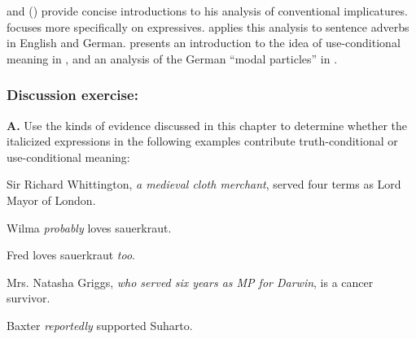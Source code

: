 \citet{Potts2007a,Potts2007b} and (\citeyear{Potts2012}) provide concise introductions to his analysis of conventional implicatures. \citet{Potts2007c} focuses more specifically on expressives. \citet{Scheffler2013} applies this analysis to sentence adverbs in English and German. \citet{Gutzman2015} presents an introduction to the idea of use-conditional meaning in , and an analysis of the German “modal particles” in .


\subsubsection{Discussion exercise:}\label{sec:}

\textbf{A.} Use the kinds of evidence discussed in this chapter to determine whether the italicized expressions in the following examples contribute truth-conditional or use-conditional meaning:

\ea \label{ex:11.}
\ea \label{ex:11.} Sir Richard Whittington, \textit{a medieval cloth merchant}, served four terms as Lord Mayor of London.

\ex Wilma \textit{probably} loves sauerkraut.

\ex Fred loves sauerkraut \textit{too}.

\ex Mrs. Natasha Griggs, \textit{who served six years as MP for Darwin}, is a cancer survivor.

\ex Baxter \textit{reportedly} supported Suharto.
\z
\z
